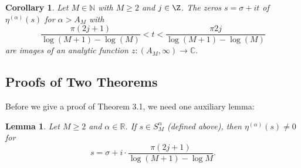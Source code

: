 \documentclass{amsart}
\theoremstyle{plain}
\newtheorem{lemma}[theorem]{Lemma}
\newtheorem{corollary}[theorem]{Corollary}
\theoremstyle{definition}
\newcommand{\etalpha}{\eta^{(\alpha)}}
\newcommand{\C}{\mathbb{C}} \newcommand{\N}{\mathbb{N}}
\begin{document}
\begin{corollary}\label{cor curve eta}
Let $M\in\N$ with $M\ge 2$ and $j\in\Z$.
The zeros $s=\sigma+it$ 
of $\etalpha(s)$ 
for $\alpha>A_M$ 
with 
\[ 
\frac{\pi (2j+1)}{\log(M+1)-\log(M)}<t<\frac{\pi2j}{\log(M+1)-\log(M)}
\]
are images of an analytic function
\(
z:(A_M,\infty)\to\C.
\)
\end{corollary}

\subsection*{Proofs of Two Theorems}

Before we give a proof of Theorem 3.1, we need one auxiliary lemma:

\begin{lemma}\label{lemline eta}
Let $M \geq 2$ and $\alpha \in \mathbb{R}$. If $s \in S_M^\alpha$ (defined above), then $\etalpha(s)\ne 0$ for
\[
s=\sigma+i\cdot\frac{\pi (2j+1)}{\log(M+1)-\log M}.
\]
\end{lemma}
\end{document}
